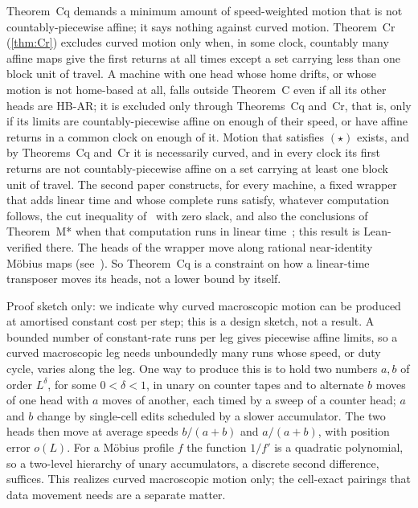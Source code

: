 \begin{remark}\label{rem:mot-scope}
Theorem~Cq demands a minimum amount of speed-weighted motion that is not countably-piecewise affine; it says nothing
against curved motion. Theorem~Cr (\cref{thm:Cr}) excludes curved motion only when, in some clock, countably many
affine maps give the first returns at all times except a set carrying less than one block unit of travel.
A machine with one head whose home drifts, or whose motion is not home-based at all, falls outside Theorem~C even if
all its other heads are HB-AR; it is excluded only through Theorems~Cq and~Cr, that is, only if its limits are
countably-piecewise affine on enough of their speed, or have affine returns in a common clock on enough of it. Motion
that satisfies $(\star)$ exists, and by Theorems~Cq and~Cr it is necessarily curved, and in every clock its first
returns are not countably-piecewise affine on a set carrying at least one block unit of travel. The second paper constructs, for every machine, a fixed wrapper
that adds linear time and whose complete runs satisfy, whatever computation follows, the cut inequality
of~\cite[Definition~7.4]{FirstPaper2026} with zero slack, and also the conclusions of Theorem~M* when that computation
runs in linear time~\cite[Theorem~8.1]{SecondPaper2026}; this result is Lean-verified there. The heads of the wrapper
move along rational near-identity M\"obius maps (see~\cite[Section~13]{FirstPaper2026}). So Theorem~Cq is a constraint
on how a linear-time transposer moves its heads, not a lower bound by itself.
\end{remark}

\begin{remark}\label{rem:mot-curved}
Proof sketch only: we indicate why curved macroscopic motion can be produced at amortised constant cost per step; this
is a design sketch, not a result. A bounded number of constant-rate runs per leg gives piecewise affine limits, so a
curved macroscopic leg needs unboundedly many runs whose speed, or duty cycle, varies along the leg. One way to produce
this is to hold two numbers $a,b$ of order $L^{\delta}$, for some
$0<\delta<1$, in unary on counter tapes and to alternate $b$ moves of one head with $a$ moves of another, each timed by
a sweep of a counter head; $a$ and $b$ change by single-cell edits scheduled by a slower accumulator. The two heads then
move at average speeds $b/(a+b)$ and $a/(a+b)$, with position error $o(L)$. For a M\"obius profile $f$ the function $1/f'$ is a quadratic
polynomial, so a two-level hierarchy of unary accumulators, a discrete second difference, suffices. This realizes
curved macroscopic motion only; the cell-exact pairings that data movement needs are a separate matter.
\end{remark}


